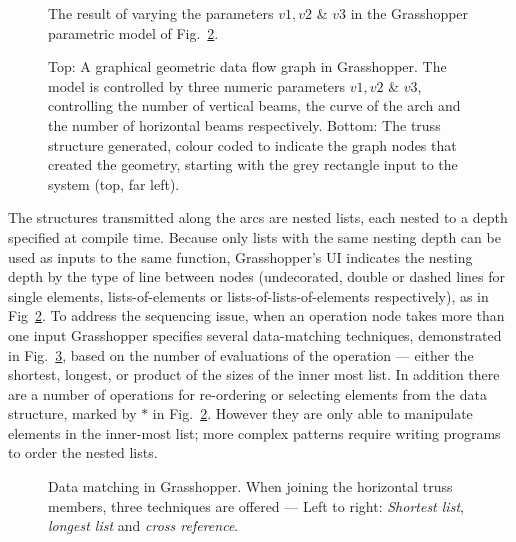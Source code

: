 \begin{figure}
\centering
\def\svgwidth{0.6\columnwidth}

\caption[Editing the parametrisations of the model in Fig.~\ref{fig:grasshopperGraph}]{\label{fig:grasshopperResults}The result of varying the parameters $v1, v2$ \& $v3$ in the Grasshopper parametric model of Fig.~\ref{fig:grasshopperGraph}.}
\end{figure}

\begin{figure}
\centering
\def\svgwidth{0.9\columnwidth}

\caption[A Grasshopper data flow graph]{\label{fig:grasshopperGraph}Top: A graphical geometric data flow graph in Grasshopper. The model is controlled by three numeric parameters $v1, v2 $ \& $v3$, controlling the number of vertical beams, the curve of the arch and the number of horizontal beams respectively. Bottom: The truss structure generated, colour coded to indicate the graph nodes that created the geometry, starting with the grey rectangle input to the system (top, far left).}
\end{figure}

The structures transmitted along the arcs are nested lists, each nested to a depth specified at compile time. Because only lists with the same nesting depth can be used as inputs to the same function, Grasshopper's UI indicates the nesting depth by the type of line between nodes (undecorated, double or dashed lines for single elements, lists-of-elements or lists-of-lists-of-elements respectively), as in Fig~\ref{fig:grasshopperGraph}. To address the sequencing issue, when an operation node takes more than one input Grasshopper specifies several data-matching techniques, demonstrated in Fig.~\ref{fig:dataMatching}, based on the number of evaluations of the operation --- either the shortest, longest, or product of the sizes of the inner most list. In addition there are a number of operations for re-ordering or selecting elements from the data structure, marked by $\ast$ in Fig.~\ref{fig:grasshopperGraph}. However they are only able to manipulate elements in the inner-most list; more complex patterns require writing programs to order the nested lists.

\begin{figure}
\centering
\def\svgwidth{1.0\columnwidth}

\caption[Data matching in Grasshopper]{\label{fig:dataMatching}Data matching in Grasshopper. When joining the horizontal truss members, three techniques are offered --- Left to right: \emph{Shortest list}, \emph{longest list} and \emph{cross reference}.}
\end{figure}

